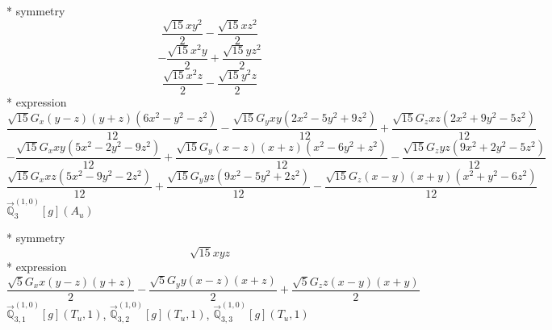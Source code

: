 \documentclass[fleqn,8pt]{jsarticle}
\begin{document}
\noindent\quad ** symmetry
\begin{dmath*}
\frac{\sqrt{15} x y^{2}}{2} - \frac{\sqrt{15} x z^{2}}{2}
\end{dmath*}
\begin{dmath*}
- \frac{\sqrt{15} x^{2} y}{2} + \frac{\sqrt{15} y z^{2}}{2}
\end{dmath*}
\begin{dmath*}
\frac{\sqrt{15} x^{2} z}{2} - \frac{\sqrt{15} y^{2} z}{2}
\end{dmath*}
\noindent\quad ** expression
\begin{dmath*}
\frac{\sqrt{15} G_{x} \left(y - z\right) \left(y + z\right) \left(6 x^{2} - y^{2} - z^{2}\right)}{12} - \frac{\sqrt{15} G_{y} x y \left(2 x^{2} - 5 y^{2} + 9 z^{2}\right)}{12} + \frac{\sqrt{15} G_{z} x z \left(2 x^{2} + 9 y^{2} - 5 z^{2}\right)}{12}
\end{dmath*}
\begin{dmath*}
- \frac{\sqrt{15} G_{x} x y \left(5 x^{2} - 2 y^{2} - 9 z^{2}\right)}{12} + \frac{\sqrt{15} G_{y} \left(x - z\right) \left(x + z\right) \left(x^{2} - 6 y^{2} + z^{2}\right)}{12} - \frac{\sqrt{15} G_{z} y z \left(9 x^{2} + 2 y^{2} - 5 z^{2}\right)}{12}
\end{dmath*}
\begin{dmath*}
\frac{\sqrt{15} G_{x} x z \left(5 x^{2} - 9 y^{2} - 2 z^{2}\right)}{12} + \frac{\sqrt{15} G_{y} y z \left(9 x^{2} - 5 y^{2} + 2 z^{2}\right)}{12} - \frac{\sqrt{15} G_{z} \left(x - y\right) \left(x + y\right) \left(x^{2} + y^{2} - 6 z^{2}\right)}{12}
\end{dmath*}
\noindent\quad $\vec{\mathbb{Q}}_{3}^{(1,0)}[g](A_{u})$

\noindent\quad ** symmetry
\begin{dmath*}
\sqrt{15} x y z
\end{dmath*}
\noindent\quad ** expression
\begin{dmath*}
\frac{\sqrt{5} G_{x} x \left(y - z\right) \left(y + z\right)}{2} - \frac{\sqrt{5} G_{y} y \left(x - z\right) \left(x + z\right)}{2} + \frac{\sqrt{5} G_{z} z \left(x - y\right) \left(x + y\right)}{2}
\end{dmath*}
\noindent\quad $\vec{\mathbb{Q}}_{3,1}^{(1,0)}[g](T_{u},1)$, $\vec{\mathbb{Q}}_{3,2}^{(1,0)}[g](T_{u},1)$, $\vec{\mathbb{Q}}_{3,3}^{(1,0)}[g](T_{u},1)$
\end{document}
